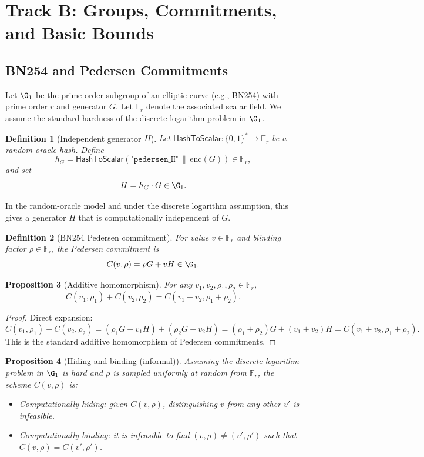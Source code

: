 \documentclass[11pt]{article}
\newtheorem{definition}{Definition}[section]
\newtheorem{proposition}[definition]{Proposition}
\newcommand{\F}{\mathbb{F}}
\begin{document}
\section{Track B: Groups, Commitments, and Basic Bounds}

\subsection{BN254 and Pedersen Commitments}

Let \(\G_1\) be the prime-order subgroup of an elliptic curve (e.g., BN254) with prime order \(r\) and generator \(G\).
Let \(\F_r\) denote the associated scalar field.
We assume the standard hardness of the discrete logarithm problem in \(\G_1\).

\begin{definition}[Independent generator \(H\)]
Let \(\mathsf{HashToScalar} : \{0,1\}^* \to \F_r\) be a random-oracle hash.
Define
\[
  h_G = \mathsf{HashToScalar}(\texttt{"pedersen\_H"} \,\|\, \mathrm{enc}(G)) \in \F_r,
\]
and set
\[
  H = h_G \cdot G \in \G_1.
\]
\end{definition}

In the random-oracle model and under the discrete logarithm assumption, this gives a generator \(H\) that is computationally independent of \(G\).\cite{PedersenZKDocs,PedersenRareSkills,CommitmentSchemeWiki}

\begin{definition}[BN254 Pedersen commitment]
For value \(v \in \F_r\) and blinding factor \(\rho \in \F_r\), the Pedersen commitment is
\[
  C(v,\rho) = \rho G + v H \in \G_1.
\]
\end{definition}

\begin{proposition}[Additive homomorphism]
For any \(v_1,v_2,\rho_1,\rho_2 \in \F_r\),
\[
  C(v_1,\rho_1) + C(v_2,\rho_2) = C(v_1+v_2,\rho_1+\rho_2).
\]
\end{proposition}

\begin{proof}
Direct expansion:
\[
  C(v_1,\rho_1) + C(v_2,\rho_2) = (\rho_1 G + v_1 H) + (\rho_2 G + v_2 H)
  = (\rho_1+\rho_2)G + (v_1+v_2)H = C(v_1+v_2,\rho_1+\rho_2).
\]
This is the standard additive homomorphism of Pedersen commitments.\cite{PedersenZKDocs,PedersenRareSkills}
\end{proof}

\begin{proposition}[Hiding and binding (informal)]
Assuming the discrete logarithm problem in \(\G_1\) is hard and \(\rho\) is sampled uniformly at random from \(\F_r\), the scheme \(C(v,\rho)\) is:
\begin{itemize}
  \item Computationally \emph{hiding}: given \(C(v,\rho)\), distinguishing \(v\) from any other \(v'\) is infeasible.
  \item Computationally \emph{binding}: it is infeasible to find \((v,\rho) \ne (v',\rho')\) such that \(C(v,\rho) = C(v',\rho')\).
\end{itemize}
\end{proposition}
\end{document}
